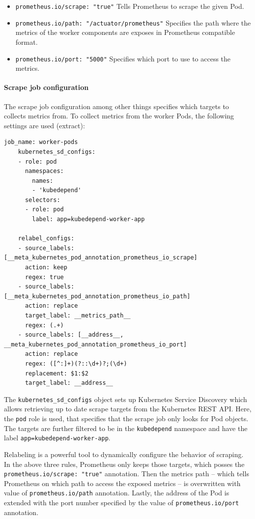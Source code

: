\begin{itemize}
	\item \texttt{prometheus.io/scrape: "true"} Tells Prometheus to scrape the given Pod.
	\item \texttt{prometheus.io/path: "/actuator/prometheus"} Specifies the path where the metrics of the worker components are exposes in Prometheus compatible format.
	\item \texttt{prometheus.io/port: "5000"} Specifies which port to use to access the metrics.
\end{itemize}

\paragraph{Scrape job configuration} The scrape job configuration among other things specifies which targets to collects metrics from. To collect metrics from the worker Pods, the following settings are used (extract):

\vspace{0.5cm}
\begin{minipage}{\linewidth}
	\begin{lstlisting}[caption={Prometheus scrape configuration for worker pods}, label={lst:worker-pods-scrape-job}]
	job_name: worker-pods
	kubernetes_sd_configs:
	- role: pod
	  namespaces:
	    names:
	    - 'kubedepend'
	  selectors:
	  - role: pod
	    label: app=kubedepend-worker-app
	
	relabel_configs:
	- source_labels: [__meta_kubernetes_pod_annotation_prometheus_io_scrape]
	  action: keep
	  regex: true
	- source_labels: [__meta_kubernetes_pod_annotation_prometheus_io_path]
	  action: replace
	  target_label: __metrics_path__
	  regex: (.+)
	- source_labels: [__address__, __meta_kubernetes_pod_annotation_prometheus_io_port]
	  action: replace
	  regex: ([^:]+)(?::\d+)?;(\d+)
	  replacement: $1:$2
	  target_label: __address__\end{lstlisting}
\end{minipage}

The \texttt{kubernetes\_sd\_configs} object sets up Kubernetes Service Discovery which allows retrieving up to date scrape targets from the Kubernetes REST API. Here, the \texttt{pod} role is used, that specifies that the scrape job only looks for Pod objects. The targets are further filtered to be in the \texttt{kubedepend} namespace and have the label \texttt{app=kubedepend-worker-app}.

Relabeling is a powerful tool to dynamically configure the behavior of scraping. In the above three rules, Prometheus only keeps those targets, which posses the \texttt{prometheus.io/scrape: "true"} annotation. Then the metrics path -- which tells Prometheus on which path to access the exposed metrics -- is overwritten with value of \texttt{prometheus.io/path} annotation. Lastly, the address of the Pod is extended with the port number specified by the value of \texttt{prometheus.io/port} annotation.

